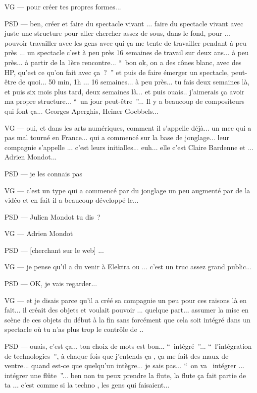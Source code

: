 VG — pour créer tes propres formes... 

PSD — ben, créer et faire du spectacle vivant ... faire du spectacle vivant avec juste une structure pour aller chercher assez de sous, dans le fond, pour ... pouvoir travailler avec les gens avec qui ça me tente de travailler pendant à peu près ... un spectacle c'est à peu près 16 semaines de travail sur deux ans... à peu près... à partir de la 1ère rencontre... “ bon ok, on a des cônes blanc, avec des HP, qu'est ce qu'on fait avec ça ? ” et puis de faire émerger un spectacle, peut-être de quoi... 50 min, 1h ... 16 semaines... à peu près... tu fais deux semaines là,  et puis six mois plus tard, deux semaines là... et puis ouais.. j'aimerais ça avoir ma propre structure... “ un jour peut-être ”... Il y a beaucoup de compositeurs qui font ça... Georges Aperghis, Heiner Goebbels... 

VG — oui, et dans les arts numériques, comment il s'appelle déjà... un mec qui a pas mal tourné en France... qui a commencé sur la base de jonglage... leur compagnie s'appelle ... c'est leurs initialles... euh... elle c'est Claire Bardenne et ... Adrien Mondot... 

PSD — je les connais pas 

VG — c'est un type qui a commencé par du jonglage un peu  augmenté par de la vidéo et en fait il a beaucoup développé le... 

PSD — Julien Mondot tu dis ? 

VG — Adrien Mondot  

PSD — [cherchant sur le web] ... 

VG — je pense qu'il a du venir à Elektra ou ... c'est un truc assez grand public... 

PSD — OK, je vais regarder... 

VG — et je disais parce qu'il a créé sa compagnie un peu pour ces raisons là en fait... il créait des objets et voulait pouvoir ... quelque part... assumer la mise en scène de ces objets du début à la fin sans forcément que cela soit intégré dans un spectacle où tu n'as plus trop le contrôle de .. 

PSD — ouais, c'est ça... ton choix de mots est bon... “ intégré ”... “ l'intégration de technologies ”,  à chaque fois que j'entends ça , ça me fait des maux de ventre... quand est-ce que quelqu'un intègre... je sais pas... “ on va  intégrer ... intégrer une flûte ”... ben non tu peux prendre la flute, la flute ça fait partie de ta ... c'est comme si la techno , les gens qui faisaient... 

